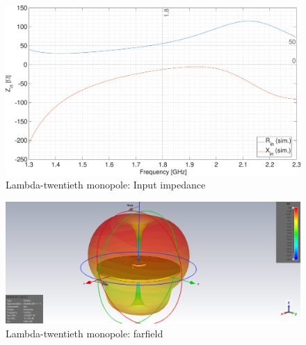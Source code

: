 \documentclass[11pt,a4paper]{article}
\begin{document}
        \begin{figure}[!ht]
            \centering
            \includegraphics[width=.8\textwidth]{src/lambda-twentieth-impedance.eps}
            \caption{\label{fig:lambda-twentieth-impedance}Lambda-twentieth monopole: Input impedance}
        \end{figure}

\newpage
        \begin{figure}[!ht]
            \centering
            \includegraphics[width=.8\textwidth]{src/lambda-twentieth-farfield.png}
            \caption{\label{fig:lambda-twentieth-farfield}Lambda-twentieth monopole: farfield}
        \end{figure}
\end{document}
